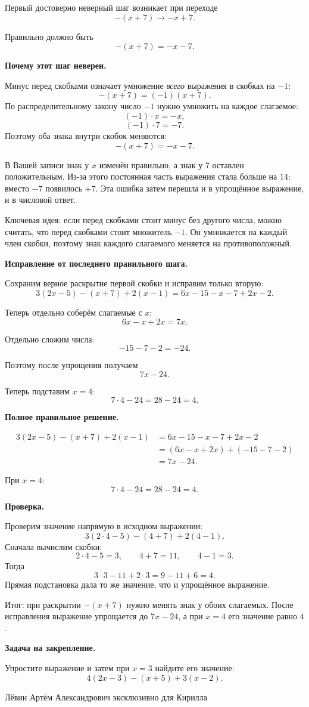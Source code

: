 \documentclass[12pt,a4paper]{article}
\begin{document}
Первый достоверно неверный шаг возникает при переходе
\[
-(x+7)\longrightarrow -x+7.
\]

Правильно должно быть
\[
-(x+7)=-x-7.
\]

\textbf{Почему этот шаг неверен.}

Минус перед скобками означает умножение \emph{всего} выражения в скобках на $-1$:
\[
-(x+7)=(-1)(x+7).
\]
По распределительному закону число $-1$ нужно умножить на каждое слагаемое:
\[
(-1)\cdot x=-x,
\]
\[
(-1)\cdot 7=-7.
\]
Поэтому оба знака внутри скобок меняются:
\[
-(x+7)=-x-7.
\]

В Вашей записи знак у $x$ изменён правильно, а знак у $7$ оставлен положительным. Из-за этого постоянная часть выражения стала больше на $14$: вместо $-7$ появилось $+7$. Эта ошибка затем перешла и в упрощённое выражение, и в числовой ответ.

\textcolor{blue!60!black}{Ключевая идея:} если перед скобками стоит минус без другого числа, можно считать, что перед скобками стоит множитель $-1$. Он умножается на каждый член скобки, поэтому знак каждого слагаемого меняется на противоположный.

\textbf{Исправление от последнего правильного шага.}

Сохраним верное раскрытие первой скобки и исправим только вторую:
\[
3(2x-5)-(x+7)+2(x-1)
=
6x-15-x-7+2x-2.
\]

Теперь отдельно соберём слагаемые с $x$:
\[
6x-x+2x=7x.
\]

Отдельно сложим числа:
\[
-15-7-2=-24.
\]

Поэтому после упрощения получаем
\[
7x-24.
\]

Теперь подставим $x=4$:
\[
7\cdot 4-24=28-24=4.
\]

\textbf{Полное правильное решение.}

\[
\begin{aligned}
3(2x-5)-(x+7)+2(x-1)
&=6x-15-x-7+2x-2\\
&=(6x-x+2x)+(-15-7-2)\\
&=7x-24.
\end{aligned}
\]

При $x=4$:
\[
7\cdot 4-24=28-24=4.
\]

\textbf{Проверка.}

Проверим значение напрямую в исходном выражении:
\[
3(2\cdot 4-5)-(4+7)+2(4-1).
\]
Сначала вычислим скобки:
\[
2\cdot 4-5=3,\qquad 4+7=11,\qquad 4-1=3.
\]
Тогда
\[
3\cdot 3-11+2\cdot 3=9-11+6=4.
\]
Прямая подстановка дала то же значение, что и упрощённое выражение.

\textcolor{teal!60!black}{Итог:} при раскрытии $-(x+7)$ нужно менять знак у обоих слагаемых. После исправления выражение упрощается до $7x-24$, а при $x=4$ его значение равно $4$.

\textbf{Задача на закрепление.}

Упростите выражение и затем при $x=3$ найдите его значение:
\[
4(2x-3)-(x+5)+3(x-2).
\]

\vfill
\begin{center}
\small Лёвин Артём Александрович эксклюзивно для Кирилла
\end{center}
\end{document}

